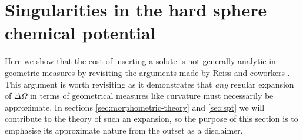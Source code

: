 \documentclass[11pt,twoside]{report}
\begin{document}
\chapter{Singularities in the hard sphere chemical potential}
\label{appendix:spt-singularities}

Here we show that the cost of inserting a solute is not generally analytic in geometric measures by revisiting the arguments made by Reiss and coworkers \cite{ReissJCP1959,ReissJCP1960}.
This argument is worth revisiting as it demonstrates that \emph{any} regular expansion of $\Delta \Omega$ in terms of geometrical measures like curvature must necessarily be approximate.
In sections \ref{sec:morphometric-theory} and \ref{sec:spt} we will contribute to the theory of such an expansion, so the purpose of this section is to emphasise its approximate nature from the outset as a disclaimer.
\end{document}
